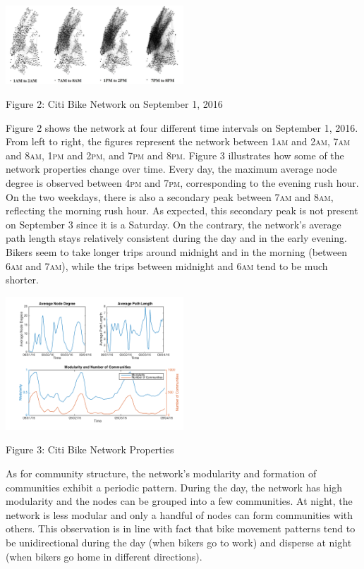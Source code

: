 \documentclass[times, 10pt,twocolumn]{article}
\begin{document}
\centerline{\includegraphics[width=0.5\textwidth]{m2/combined.jpg}}
\centerline{Figure 2: Citi Bike Network on September 1, 2016}
\hfill \break
\indent Figure 2 shows the network at four different time intervals on September 1, 2016. From left to right, the figures represent the network between 1\textsc{am} and 2\textsc{am}, 7\textsc{am} and 8\textsc{am}, 1\textsc{pm} and 2\textsc{pm}, and 7\textsc{pm} and 8\textsc{pm}. Figure 3 illustrates how some of the network properties change over time. Every day, the maximum average node degree is observed between 4\textsc{pm} and 7\textsc{pm}, corresponding to the evening rush hour. On the two weekdays, there is also a secondary peak between 7\textsc{am} and 8\textsc{am}, reflecting the morning rush hour. As expected, this secondary peak is not present on September 3 since it is a Saturday. On the contrary, the network's average path length stays relatively consistent during the day and in the early evening. Bikers seem to take longer trips around midnight and in the morning (between 6\textsc{am} and 7\textsc{am}), while the trips between midnight and 6\textsc{am} tend to be much shorter.

\centerline{\includegraphics[width=0.5\textwidth]{m2/plotterfigure.png}}
\centerline{Figure 3: Citi Bike Network Properties}
\hfill \break
\indent As for community structure, the network's modularity and formation of communities exhibit a periodic pattern. During the day, the network has high modularity and the nodes can be grouped into a few communities. At night, the network is less modular and only a handful of nodes can form communities with others. This observation is in line with fact that bike movement patterns tend to be unidirectional during the day (when bikers go to work) and disperse at night (when bikers go home in different directions).
\end{document}
